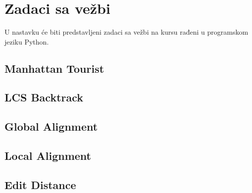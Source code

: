 \newpage
\section{Zadaci sa vežbi}
\setexamplecodestyle

U nastavku će biti predstavljeni zadaci sa vežbi na kursu rađeni u programskom jeziku Python.

\subsection{Manhattan Tourist}



\subsection{LCS Backtrack}



\subsection{Global Alignment}



\subsection{Local Alignment}



\subsection{Edit Distance}

